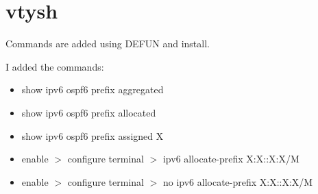 \chapter{vtysh}
\label{vtysh}

Commands are added using DEFUN and install.

I added the commands:
\begin{itemize}
  \item show ipv6 ospf6 prefix aggregated
  \item show ipv6 ospf6 prefix allocated 
  \item show ipv6 ospf6 prefix assigned X

  \item enable $>$ configure terminal $>$ ipv6 allocate-prefix X:X::X:X/M
  \item enable $>$ configure terminal $>$ no ipv6 allocate-prefix X:X::X:X/M
\end{itemize}
